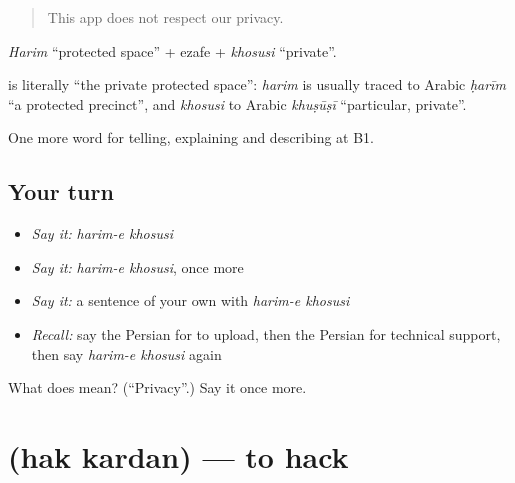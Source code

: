 \begin{quote}
This app does not respect our privacy.
\end{quote}

\emph{Harim} \textquotedblleft{}protected space\textquotedblright{} + ezafe + \emph{khosusi} \textquotedblleft{}private\textquotedblright{}.

\begin{cousinweb}
\textbf{ } is literally \textquotedblleft{}the private protected space\textquotedblright{}: \emph{harim} is usually traced to Arabic \emph{ḥarīm} \textquotedblleft{}a protected precinct\textquotedblright{}, and \emph{khosusi} to Arabic \emph{khuṣūṣī} \textquotedblleft{}particular, private\textquotedblright{}.
\end{cousinweb}

\begin{grammarlens}[title={What you've built}]
One more word for telling, explaining and describing at B1.
\end{grammarlens}

\subsection*{Your turn}
\begin{itemize}
\raggedright
  \item \emph{Say it:} \emph{harim-e khosusi}
  \item \emph{Say it:} \emph{harim-e khosusi}, once more
  \item \emph{Say it:} a sentence of your own with \emph{harim-e khosusi}
  \item \emph{Recall:} say the Persian for to upload, then the Persian for technical support, then say \emph{harim-e khosusi} again
\end{itemize}

\begin{tcolorbox}[breakable,colback=teal!4,colframe=teal!35!black,title={Before you move on}]
What does   mean? (\textquotedblleft{}Privacy\textquotedblright{}.) Say it once more.
\end{tcolorbox}
\section[\texorpdfstring{\fa{هک} \fa{کردن} (hak kardan)}{هک کردن (hak kardan)}]{  (hak kardan) — to hack}

\label{lesson:FA-C419-hak-kardan}




